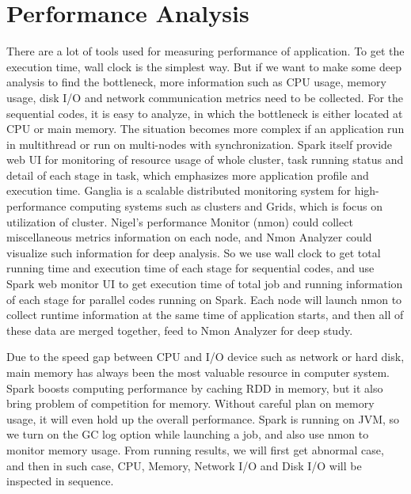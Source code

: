 \section{Performance Analysis}
There are a lot of tools used for measuring performance of application. To get the execution time, wall clock is the simplest way. But if we want to make some deep analysis to find the bottleneck, more information such as CPU usage, memory usage, disk I/O and network communication metrics need to be collected. For the sequential codes, it is easy to analyze, in which the bottleneck is either located at CPU or main memory. The situation becomes more complex if an application run in multithread or run on multi-nodes with synchronization. Spark itself provide web UI for monitoring of resource usage of whole cluster, task running status and detail of each stage in task, which emphasizes more application profile and execution time. Ganglia\cite{GangliaMain} is a scalable distributed monitoring system for high-performance computing systems such as clusters and Grids, which is focus on utilization of cluster. Nigel's performance Monitor (nmon) could collect miscellaneous metrics information on each node, and Nmon Analyzer could visualize such information for deep analysis. So we use wall clock to get total running time and execution time of each stage for sequential codes, and use Spark web monitor UI to get execution time of total job and running information of each stage for parallel codes running on Spark. Each node will launch nmon to collect runtime information at the same time of application starts, and then all of these data are merged together, feed to Nmon Analyzer for deep study. 

Due to the speed gap between CPU and I/O device such as network or hard disk, main memory has always been the most valuable resource in computer system. Spark boosts computing performance by caching  RDD in memory, but it also bring problem of competition for memory. Without careful plan on memory usage, it will even hold up the overall performance. Spark is running on JVM, so we turn on the GC log option while launching a job, and also use nmon to monitor memory usage. From running results, we will first get abnormal case, and then in such case, CPU, Memory, Network I/O and Disk I/O will be inspected in sequence.  

